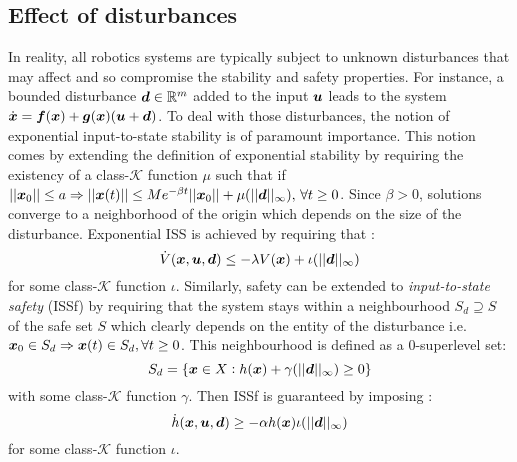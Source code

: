 \subsection{Effect of disturbances}
In reality, all robotics systems are typically subject to unknown disturbances that may affect and so compromise the stability and safety properties. For instance, a bounded disturbance $\boldsymbol{d}\in\mathbb{R}^m$ added to the input $\boldsymbol{u}$ leads to the system $\dot{\boldsymbol{x}} = \boldsymbol{f}(\boldsymbol{x})+\boldsymbol{g}(\boldsymbol{x})(\boldsymbol{u}+\boldsymbol{d})$. To deal with those disturbances, the notion of exponential input-to-state stability is of paramount importance. This notion comes by extending the definition of exponential stability by requiring the existency of a class-$\mathcal{K}$ function $\mu$ such that if $||\boldsymbol{x}_0||  \leq a \Rightarrow  ||\boldsymbol{x}(t)||\leq Me^{-\beta t}||\boldsymbol{x}_0||+ \mu(||\boldsymbol{d}||_\infty ),\, \forall t \geq 0$. 
Since $\beta>0$, solutions converge to a neighborhood of the origin which depends on the size of the disturbance. Exponential ISS is achieved by requiring that : 
\begin{equation} 
\dot{V}(\boldsymbol{x},\boldsymbol{u},\boldsymbol{d}) \leq -\lambda V(\boldsymbol{x})+\iota( ||\boldsymbol{d}||_\infty)
\end{equation} for some class-$\mathcal{K}$ function $\iota$. Similarly, safety can be extended to \textit{input-to-state safety} (ISSf) by requiring that the system stays within a neighbourhood $S_d \supseteq  S $ of the safe set $S$ which clearly depends on the entity of the disturbance i.e. $\boldsymbol{x}_0 \in S_d \Rightarrow \boldsymbol{x}(t) \in S_d, \forall t\geq 0$. This neighbourhood is defined as a 0-superlevel set: 
\begin{equation}
    S_d = \{\boldsymbol{x} \in X: h(\boldsymbol{x}) + \gamma(||\boldsymbol{d}||_\infty)\geq 0\} 
\end{equation}
with some class-$\mathcal{K}$ function $\gamma$. Then ISSf is guaranteed by imposing : 
\begin{equation}
    \dot{h}(\boldsymbol{x},\boldsymbol{u},\boldsymbol{d})\geq -\alpha h(\boldsymbol{x})  \iota(||\boldsymbol{d}||_\infty) 
\end{equation}
for some class-$\mathcal{K}$ function $\iota$.